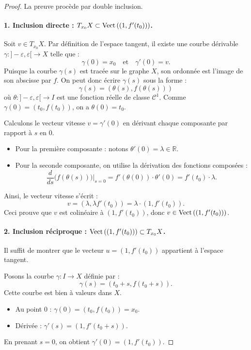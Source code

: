 \begin{proof}
    La preuve procède par double inclusion.

    \paragraph{1. Inclusion directe : $T_{x_0}X \subset \operatorname{Vect} \,((1, f'(t_0)))$.}

    Soit $v \in T_{x_0}X$. Par définition de l'espace tangent, il existe une courbe dérivable $\gamma : ]-\varepsilon, \varepsilon[ \to X$ telle que :
    \[
        \gamma(0) = x_0 \quad \text{et} \quad \gamma'(0) = v.
    \]
    Puisque la courbe $\gamma(s)$ est tracée sur le graphe $X$, son ordonnée est l'image de son abscisse par $f$. On peut donc écrire $\gamma(s)$ sous la forme :
    \[
        \gamma(s) = (\theta(s), f(\theta(s)))
    \]
    où $\theta : ]-\varepsilon, \varepsilon[ \to I$ est une fonction réelle de classe $\mathscr{C}^1$.
    Comme $\gamma(0) = (t_0, f(t_0))$, on a $\theta(0) = t_0$.
    
    Calculons le vecteur vitesse $v = \gamma'(0)$ en dérivant chaque composante par rapport à $s$ en $0$.
    \begin{itemize}
        \item Pour la première composante : notons $\theta'(0) = \lambda \in \mathbb{R}$.
        \item Pour la seconde composante, on utilise la dérivation des fonctions composées :
        \[
            \frac{d}{ds}\Big( f(\theta(s)) \Big)\Big|_{s=0} = f'(\theta(0)) \cdot \theta'(0) = f'(t_0) \cdot \lambda.
        \]
    \end{itemize}
    
    Ainsi, le vecteur vitesse s'écrit :
    \[
        v = (\lambda, \lambda f'(t_0)) = \lambda \cdot (1, f'(t_0)).
    \]
    Ceci prouve que $v$ est colinéaire à $(1, f'(t_0))$, donc $v \in \operatorname{Vect} \,((1, f'(t_0)))$.

    \paragraph{2. Inclusion réciproque : $\operatorname{Vect} \,((1, f'(t_0))) \subset T_{x_0}X$.}

    Il suffit de montrer que le vecteur $u = (1, f'(t_0))$ appartient à l'espace tangent.
    
    Posons la courbe $\gamma : I \to X$ définie par :
    \[
        \gamma(s) = (t_0 + s, f(t_0 + s)).
    \]
    Cette courbe est bien à valeurs dans $X$.
    \begin{itemize}
        \item Au point 0 : $\gamma(0) = (t_0, f(t_0)) = x_0$.
        \item Dérivée : $\gamma'(s) = (1, f'(t_0 + s))$.
    \end{itemize}
    En prenant $s=0$, on obtient $\gamma'(0) = (1, f'(t_0))$.
    

\end{proof}
